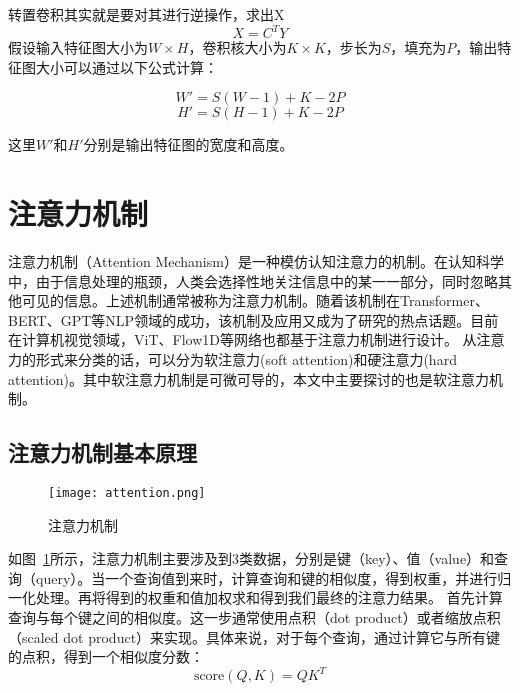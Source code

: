 转置卷积其实就是要对其进行逆操作，求出X
\begin{equation}
  X=C^T Y
\end{equation}
假设输入特征图大小为\(W \times H\)，卷积核大小为\(K \times K\)，步长为\(S\)，填充为\(P\)，输出特征图大小可以通过以下公式计算：

\[ W' = S(W-1) + K - 2P \]
\[ H' = S(H-1) + K - 2P \]

这里\(W'\)和\(H'\)分别是输出特征图的宽度和高度。

\section{注意力机制}
注意力机制（Attention Mechanism）\cite{vaswani2017attention}是一种模仿认知注意力的机制。在认知科学中，由于信息处理的瓶颈，人类会选择性地关注信息中的某一一部分，同时忽略其他可见的信息。上述机制通常被称为注意力机制。随着该机制在Transformer\cite{vaswani2017attention}、BERT\cite{2018BERTPretrainingDeepBidirectionalTransformersLanguageUnderstanding}、GPT\cite{2023GenerativePretrainedTransformerComprehensiveReviewEnablingTechnologiesPotentialApplicationsEmergingChallengesFutureDirections}等NLP领域的成功，该机制及应用又成为了研究的热点话题。目前在计算机视觉领域，ViT\cite{2020ImageWorth16x16WordsTransformersImageRecognitionScale}、Flow1D\cite{2022ComparisonPoolingMethodsConvolutionalNeuralNetworks}等网络也都基于注意力机制进行设计。
从注意力的形式来分类的话，可以分为软注意力(soft attention)和硬注意力(hard attention)。其中软注意力机制是可微可导的，本文中主要探讨的也是软注意力机制。

\subsection{注意力机制基本原理}

\begin{figure}[h]
  \centering
  \texttt{[image: attention.png]}
  \caption{注意力机制}
  \label{fig:attention}
\end{figure}

如图~\ref{fig:attention}所示，注意力机制主要涉及到3类数据，分别是键（key）、值（value）和查询（query）。当一个查询值到来时，计算查询和键的相似度，得到权重，并进行归一化处理。再将得到的权重和值加权求和得到我们最终的注意力结果。
首先计算查询与每个键之间的相似度。这一步通常使用点积（dot product）或者缩放点积（scaled dot product）来实现。具体来说，对于每个查询，通过计算它与所有键的点积，得到一个相似度分数：
\begin{equation}
  \text{score}(Q, K) = QK^T 
\end{equation}

